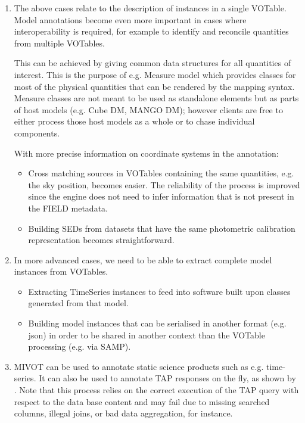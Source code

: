 \begin{enumerate}
  \item The above cases relate to the description of instances in a
  single VOTable. Model annotations become even more important in cases
  where interoperability is required, for example to identify and
  reconcile quantities from multiple VOTables.

  This can be achieved by giving  common data structures for all 
  quantities of interest. This is the purpose of e.g. Measure model 
  which provides classes for most of the physical quantities that can 
  be rendered by the mapping syntax. Measure classes are not meant to 
  be used as standalone elements but as parts of host models 
  (e.g. Cube DM, MANGO DM);
  however clients are free to either process those host models as a
  whole or to chase individual components.
  
  With more precise information on coordinate systems in the annotation:
    \begin{itemize}
      \item Cross matching sources in VOTables containing the same quantities, e.g. the sky position, becomes easier.
            The reliability of the process is improved since the engine does not need to infer information that is not present in the FIELD metadata.
      \item Building SEDs from datasets that have the same photometric calibration representation becomes straightforward.
   \end{itemize}          

  \item In more advanced cases, we need to be able to extract complete model instances from VOTables.
    \begin{itemize}
      \item Extracting  TimeSeries instances to feed into software built upon classes generated from that model.
      \item Building model instances that can be serialised in another format (e.g. json) in order to be shared in another context than 
            the VOTable processing (e.g. via SAMP).
   \end{itemize}         
    
   \item MIVOT can be used to annotate static science products such as e.g. time-series. It can also be used to annotate 
    TAP responses on the fly, as shown by \cite{2201.01732}. Note that this process relies on the correct execution of the TAP query 
    with respect to the data base content and may fail due to missing searched columns, illegal joins, or bad data aggregation, for instance. 
   
    
\end{enumerate} 

